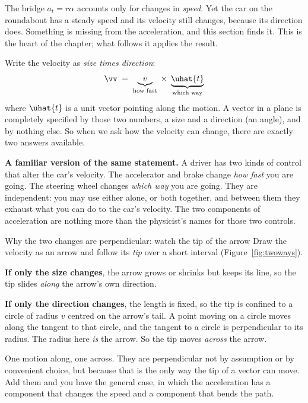 The bridge $a_t=r\alpha$ accounts only for changes in \emph{speed}. Yet the car on the roundabout
has a steady speed and its velocity still changes, because its direction does. Something is missing
from the acceleration, and this section finds it. This is the heart of the chapter; what follows it
applies the result.

Write the velocity as \emph{size times direction}:
\[
\vv \;=\; \underbrace{v}_{\text{how fast}}\;\times\;\underbrace{\uhat{t}}_{\text{which way}}
\]
where $\uhat{t}$ is a unit vector pointing along the motion. A vector in a plane is completely
specified by those two numbers, a size and a direction (an angle), and by nothing else. So when we ask
how the velocity can change, there are exactly two answers available.

\smallskip
\textbf{A familiar version of the same statement.} A driver has two kinds of control that alter the
car's velocity. The accelerator and brake change \emph{how fast} you are going. The steering
wheel changes \emph{which way} you are going. They are independent: you may use either alone, or both
together, and between them they exhaust what you can do to the car's velocity. The two components of
acceleration are nothing more than the physicist's names for those two controls.


\begin{motivbox}{Why the two changes are perpendicular: watch the tip of the arrow}
Draw the velocity as an arrow and follow its \emph{tip} over a short interval (Figure~\ref{fig:twoways}).

\smallskip
\textbf{If only the size changes}, the arrow grows or shrinks but keeps its line, so the tip slides
\emph{along} the arrow's own direction.

\smallskip
\textbf{If only the direction changes}, the length is fixed, so the tip is confined to a circle of
radius $v$ centred on the arrow's tail. A point moving on a circle moves along the tangent to that
circle, and the tangent to a circle is perpendicular to its radius. The radius here \emph{is} the
arrow. So the tip moves \emph{across} the arrow.

\smallskip
One motion along, one across. They are perpendicular not by assumption or by convenient choice, but
because that is the only way the tip of a vector can move. Add them and you have the general case, in
which the acceleration has a component that changes the speed and a component that bends the path.
\end{motivbox}

